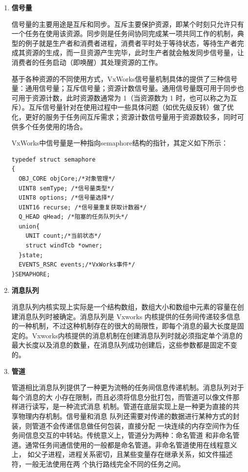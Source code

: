 \begin{enumerate}
	\item \textbf{信号量}
	
	信号量的主要用途是互斥和同步。互斥主要保护资源，即某个时刻只允许只有一个任务在使用该资源。同步则是任务间协同完成某一项共同工作的机制，典型的例子就是生产者和消费者进程，消费者平时处于等待状态，等待生产者完成其资源的生成，而一旦资源产生完毕，此时生产者就会触发同步信号量，让消费者的任务启动（即唤醒）其处理资源的工作。
	
	基于各种资源的不同使用方式，VxWorks信号量机制具体的提供了三种信号量：通用信号量；互斥信号量；资源计数信号量。通用信号量既可用于同步也可用于资源计数，此时资源数通常为 1（当资源数为 1 时，也可以称之为互斥）。互斥信号量针对在使用过程中一些具体问题（如优先级反转）做了优化，更好的服务于任务间互斥需求；资源计数信号量用于资源数较多，同时可供多个任务使用的场合。
	
	VxWorks中信号量是一种指向semaphore结构的指针，其定义如下所示：
\lstset{language=C}
\begin{lstlisting}
typedef struct semaphore
{
  OBJ_CORE objCore;/*对象管理*/
  UINT8 semType; /*信号量类型*/
  UINT8 options; /*信号量选择*/
  UINT16 recurse; /*信号量重复获取计数器*/
  Q_HEAD qHead; /*阻塞的任务队列头*/
  union{
	UNIT count;/*当前状态*/
	struct windTcb *owner;  
  }state;
  EVENTS_RSRC events;/*VxWorks事件*/
}SEMAPHORE;
\end{lstlisting}
	
	\item \textbf{消息队列}
	
	消息队列内核实现上实际是一个结构数组，数组大小和数组中元素的容量在创建消息队列时被确定。消息队列是 Vxworks 内核提供的任务间传递较多信息的一种机制，不过这种机制存在的很大的局限性，即每个消息的最大长度是固定的。Vxworks内核提供的消息机制在创建消息队列时就必须指定单个消息的最大长度以及消息的数量，在消息队列成功创建后，这些参数都是固定不变的。
	
	\item \textbf{管道}
	
	管道相比消息队列提供了一种更为流畅的任务间信息传递机制。消息队列对于每个消息的大
小存在限制，而且必须将信息分批打包，而管道可以像文件那样进行读写，是一种流式消息
机制。管道在底层实现上是一种更为直接的共享物理内存机制。信号量和消息
队列还需要对传递的数据进行某种方式的封装，则管道不会传递信息做任何包装，直接分配
一块连续的内存空间作为任务间信息交互的中转站。传统意义上，管道分为两种：命名管道
和非命名管道。通常任务间通信使用的一般都是命名管道。非命名管道使用在线程意义上，
如父子进程，进程关系密切，且某些变量存在继承关系，如文件描述符，一般无法使用在两
个执行路线完全不同的任务之间。
\end{enumerate}\\		
